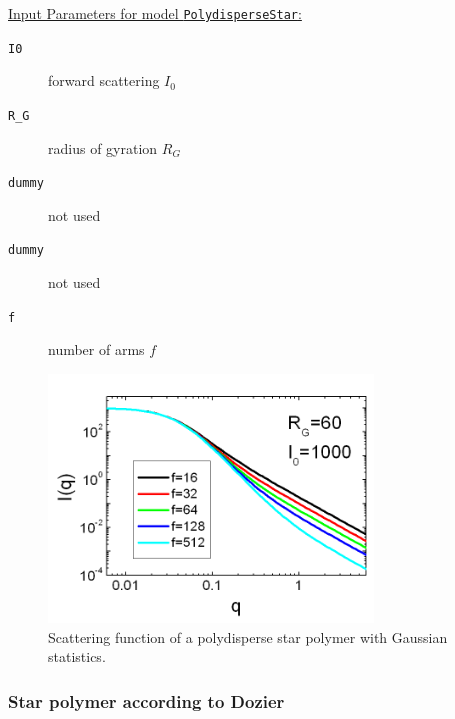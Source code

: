 \vspace{5mm}

\noindent
\uline{Input Parameters for model \texttt{PolydisperseStar}:}
\begin{description}
\item[\texttt{I0}] forward scattering $I_0$
\item[\texttt{R\_G}] radius of gyration $R_G$
\item[\texttt{dummy}] not used
\item[\texttt{dummy}] not used
\item[\texttt{f}] number of arms $f$
\end{description}


\begin{figure}[htb]
\begin{center}
\includegraphics[width=0.768\textwidth,height=0.588\textwidth]{polyBenoit_Iq.png}
\end{center}
\caption{Scattering function of a polydisperse star polymer with Gaussian statistics.} \label{fig:polyBenoit_Iq}
\end{figure}



\clearpage
\subsubsection{Star polymer according to Dozier}
\label{sect:DozierStar}
~\\
